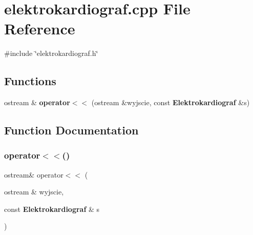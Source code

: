 \section{elektrokardiograf.\+cpp File Reference}
\label{elektrokardiograf_8cpp}
{\ttfamily \#include \char`\"{}elektrokardiograf.\+h\char`\"{}}\newline
\subsection*{Functions}
\begin{DoxyCompactItemize}
\item 
ostream \& \textbf{ operator$<$$<$} (ostream \&wyjscie, const \textbf{ Elektrokardiograf} \&s)
\end{DoxyCompactItemize}


\subsection{Function Documentation}
\mbox{\label{elektrokardiograf_8cpp_a10836bab7baab06a7a2a5d276b1eee15}} 
\subsubsection{operator$<$$<$()}
{\footnotesize\ttfamily ostream\& operator$<$$<$ (\begin{DoxyParamCaption}\item[{ostream \&}]{wyjscie,  }\item[{const \textbf{ Elektrokardiograf} \&}]{s }\end{DoxyParamCaption})}

